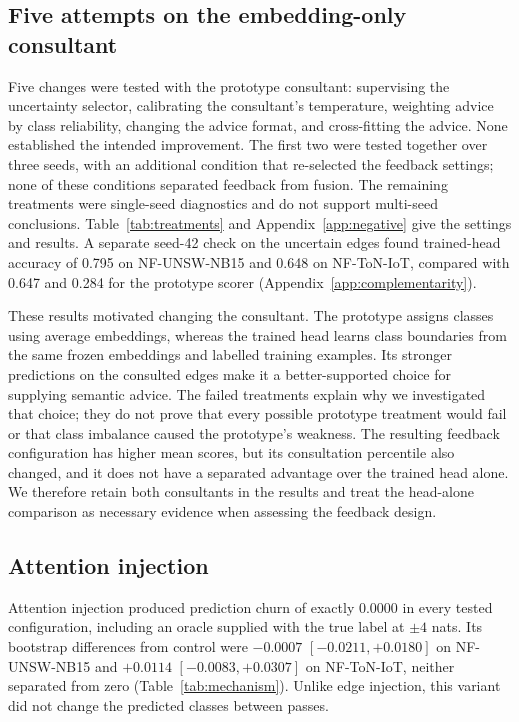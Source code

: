 \FloatBarrier
\subsection{Five attempts on the embedding-only consultant}
\label{sec:res-prototype}

Five changes were tested with the prototype consultant: supervising the uncertainty selector, calibrating the consultant's temperature, weighting advice by class reliability, changing the advice format, and cross-fitting the advice. None established the intended improvement. The first two were tested together over three seeds, with an additional condition that re-selected the feedback settings; none of these conditions separated feedback from fusion. The remaining treatments were single-seed diagnostics and do not support multi-seed conclusions. Table~\ref{tab:treatments} and Appendix~\ref{app:negative} give the settings and results. A separate seed-42 check on the uncertain edges found trained-head accuracy of 0.795 on NF-UNSW-NB15 and 0.648 on NF-ToN-IoT, compared with 0.647 and 0.284 for the prototype scorer (Appendix~\ref{app:complementarity}).

These results motivated changing the consultant. The prototype assigns classes using average embeddings, whereas the trained head learns class boundaries from the same frozen embeddings and labelled training examples. Its stronger predictions on the consulted edges make it a better-supported choice for supplying semantic advice. The failed treatments explain why we investigated that choice; they do not prove that every possible prototype treatment would fail or that class imbalance caused the prototype's weakness. The resulting feedback configuration has higher mean scores, but its consultation percentile also changed, and it does not have a separated advantage over the trained head alone. We therefore retain both consultants in the results and treat the head-alone comparison as necessary evidence when assessing the feedback design.



\FloatBarrier
\subsection{Attention injection}
\label{sec:res-attention}

Attention injection produced prediction churn of exactly 0.0000 in every tested configuration, including an oracle supplied with the true label at $\pm 4$ nats. Its bootstrap differences from control were $-0.0007$ $[-0.0211, +0.0180]$ on NF-UNSW-NB15 and $+0.0114$ $[-0.0083, +0.0307]$ on NF-ToN-IoT, neither separated from zero (Table~\ref{tab:mechanism}). Unlike edge injection, this variant did not change the predicted classes between passes.

